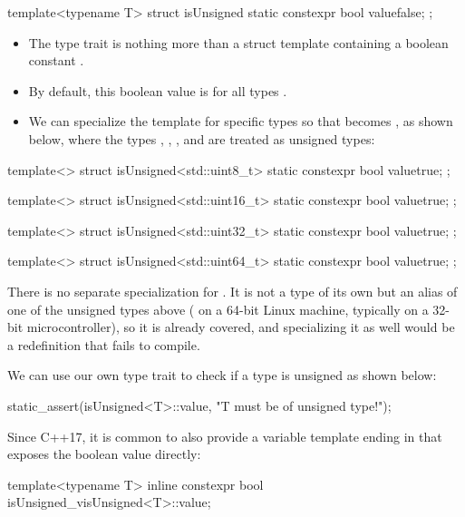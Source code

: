 \begin{cppcode}
template<typename T>
struct isUnsigned
{
    static constexpr bool value{false};
};
\end{cppcode}

\note
\begin{itemize}
  \item The type trait is nothing more than a struct template containing a boolean constant
    .
  \item By default, this boolean value is  for all types .
  \item We can specialize the template for specific types  so that  becomes
    , as shown below, where the types , ,
    , and  are treated as unsigned types:
\end{itemize}

\begin{cppcode}
template<>
struct isUnsigned<std::uint8_t>
{
    static constexpr bool value{true};
};

template<>
struct isUnsigned<std::uint16_t>
{
    static constexpr bool value{true};
};

template<>
struct isUnsigned<std::uint32_t>
{
    static constexpr bool value{true};
};

template<>
struct isUnsigned<std::uint64_t>
{
    static constexpr bool value{true};
};
\end{cppcode}

\note There is no separate specialization for . It is not a type of its own but
an alias of one of the unsigned types above ( on a 64-bit Linux machine,
typically  on a 32-bit microcontroller), so it is already covered, and
specializing it as well would be a redefinition that fails to compile.


\noindent We can use our own type trait  to check if a type  is
unsigned as shown below:

\begin{cppcode}
static_assert(isUnsigned<T>::value, "T must be of unsigned type!");
\end{cppcode}

\noindent Since C++17, it is common to also provide a variable template ending in  that
exposes the boolean value directly:

\begin{cppcode}
template<typename T>
inline constexpr bool isUnsigned_v{isUnsigned<T>::value};
\end{cppcode}

